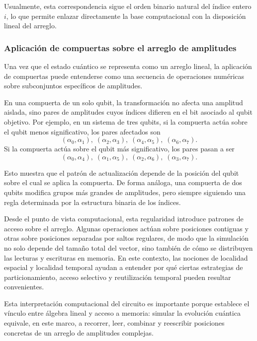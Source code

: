 Usualmente, esta correspondencia sigue el orden binario natural del índice entero $i$, lo que permite enlazar directamente la base computacional con la disposición lineal del arreglo.

\subsubsection{Aplicación de compuertas sobre el arreglo de amplitudes}

Una vez que el estado cuántico se representa como un arreglo lineal, la aplicación de compuertas puede entenderse como una secuencia de operaciones numéricas sobre subconjuntos específicos de amplitudes.

En una compuerta de un solo qubit, la transformación no afecta una amplitud aislada, sino pares de amplitudes cuyos índices difieren en el bit asociado al qubit objetivo. Por ejemplo, en un sistema de tres qubits, si la compuerta actúa sobre el qubit menos significativo, los pares afectados son
\[
    (\alpha_0,\alpha_1),\;
    (\alpha_2,\alpha_3),\;
    (\alpha_4,\alpha_5),\;
    (\alpha_6,\alpha_7).
\]
Si la compuerta actúa sobre el qubit más significativo, los pares pasan a ser
\[
    (\alpha_0,\alpha_4),\;
    (\alpha_1,\alpha_5),\;
    (\alpha_2,\alpha_6),\;
    (\alpha_3,\alpha_7).
\]

Esto muestra que el patrón de actualización depende de la posición del qubit sobre el cual se aplica la compuerta. De forma análoga, una compuerta de dos qubits modifica grupos más grandes de amplitudes, pero siempre siguiendo una regla determinada por la estructura binaria de los índices.

Desde el punto de vista computacional, esta regularidad introduce patrones de acceso sobre el arreglo. Algunas operaciones actúan sobre posiciones contiguas y otras sobre posiciones separadas por saltos regulares, de modo que la simulación no solo depende del tamaño total del vector, sino también de cómo se distribuyen las lecturas y escrituras en memoria. En este contexto, las nociones de localidad espacial y localidad temporal ayudan a entender por qué ciertas estrategias de particionamiento, acceso selectivo y reutilización temporal pueden resultar convenientes.

Esta interpretación computacional del circuito es importante porque establece el vínculo entre álgebra lineal y acceso a memoria: simular la evolución cuántica equivale, en este marco, a recorrer, leer, combinar y reescribir posiciones concretas de un arreglo de amplitudes complejas.

